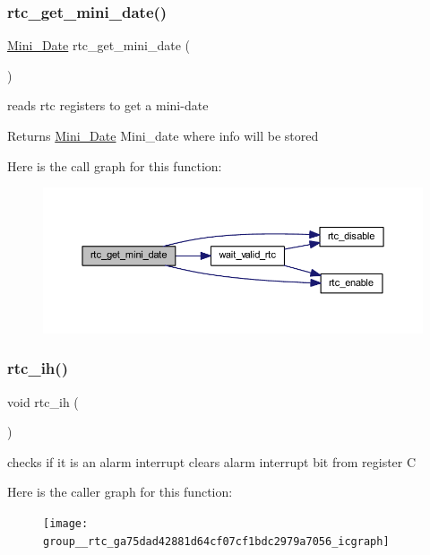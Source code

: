 \subsubsection{\texorpdfstring{rtc\+\_\+get\+\_\+mini\+\_\+date()}{rtc\_get\_mini\_date()}}
{\footnotesize\ttfamily \mbox{\hyperlink{struct_mini___date}{Mini\+\_\+\+Date}} rtc\+\_\+get\+\_\+mini\+\_\+date (\begin{DoxyParamCaption}{ }\end{DoxyParamCaption})}



reads rtc registers to get a mini-\/date 

\begin{DoxyReturn}{Returns}
\mbox{\hyperlink{struct_mini___date}{Mini\+\_\+\+Date}} Mini\+\_\+date where info will be stored 
\end{DoxyReturn}
Here is the call graph for this function\+:
\nopagebreak
\begin{figure}[H]
\begin{center}
\leavevmode
\includegraphics[width=350pt]{group__rtc_gafd5a541a5a16634152431be542dc9565_cgraph}
\end{center}
\end{figure}
\mbox{\label{group__rtc_ga75dad42881d64cf07cf1bdc2979a7056}} 
\subsubsection{\texorpdfstring{rtc\+\_\+ih()}{rtc\_ih()}}
{\footnotesize\ttfamily void rtc\+\_\+ih (\begin{DoxyParamCaption}{ }\end{DoxyParamCaption})}



checks if it is an alarm interrupt clears alarm interrupt bit from register C 

Here is the caller graph for this function\+:\nopagebreak
\begin{figure}[H]
\begin{center}
\leavevmode
\texttt{[image: group\_\_rtc\_ga75dad42881d64cf07cf1bdc2979a7056\_icgraph]}
\end{center}
\end{figure}
\mbox{\label{group__rtc_ga5171a9c0f54940fe60f7500896afcc86}} 
